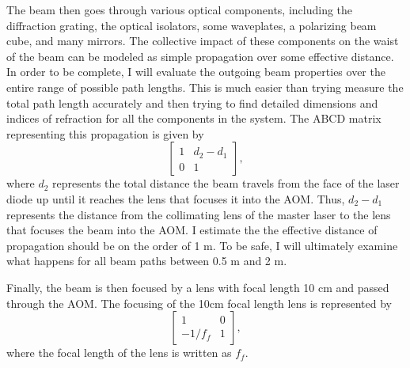 The beam then goes through various optical components, including the diffraction grating, the optical isolators, some waveplates, a polarizing beam cube, and many mirrors. The collective impact of these components on the waist of the beam can be modeled as simple propagation over some effective distance. %
In order to be complete, I will evaluate the outgoing beam properties over the entire range of possible path lengths. This is much easier than trying measure the total path length accurately and then trying to find detailed dimensions and indices of refraction for all the components in the system. The ABCD matrix representing this propagation is given by
\begin{equation}
\begin{bmatrix}\label{ABCD3}
1 & d_2-d_1 \\ 0 & 1
\end{bmatrix},
\end{equation}
where $d_2$ represents the total distance the beam travels from the face of the laser diode up until it reaches the lens that focuses it into the AOM. Thus, $d_2-d_1$ represents the distance from the collimating lens of the master laser to the lens that focuses the beam into the AOM. 
I estimate the the effective distance of propagation should be on the order of 1 m. To be safe, I will ultimately examine what happens for all beam paths between 0.5 m and 2 m. 

Finally, the beam is then focused by a lens with focal length 10 cm and passed through the AOM. The focusing of the 10cm focal length lens is represented by
\begin{equation}
\begin{bmatrix}\label{ABCD4}
1 & 0 \\ -1/f_{f} & 1
\end{bmatrix},
\end{equation} 
where the focal length of the lens is written as $f_{f}$.

